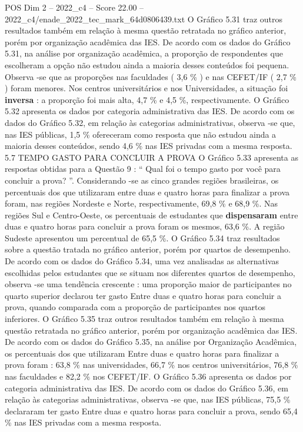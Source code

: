 \begin{textsample}{POS Dim 2 – 2022\_c4 – Score 22.00 – 2022\_c4/enade\_2022\_tec\_mark\_64d0806439.txt}
O Gráfico 5.31 traz outros resultados também em relação à mesma questão retratada no gráfico anterior, porém por organização acadêmica das IES.
De acordo com os dados do Gráfico 5.31, na análise por organização acadêmica, a proporção de respondentes que escolheram a opção não estudou ainda a maioria desses conteúdos foi pequena.
Observa -se que as proporções nas faculdades ( 3,6 \% ) e nas CEFET/IF ( 2,7 \% ) foram menores.
Nos centros universitários e nos Universidades, a situação foi \textbf{inversa} : a proporção foi mais alta, 4,7 \% e 4,5 \%, respectivamente.
O Gráfico 5.32 apresenta os dados por categoria administrativa das IES.
De acordo com os dados do Gráfico 5.32, em relação às categorias administrativas, observa -se que, nas IES públicas, 1,5 \% ofereceram como resposta que não estudou ainda a maioria desses conteúdos, sendo 4,6 \% nas IES privadas com a mesma resposta. 5.7 TEMPO GASTO PARA CONCLUIR A PROVA O Gráfico 5.33 apresenta as respostas obtidas para a Questão 9 : “ Qual foi o tempo gasto por você para concluir a prova? ”.
Considerando -se as cinco grandes regiões brasileiras, os percentuais dos que utilizaram entre duas e quatro horas para finalizar a prova foram, nas regiões Nordeste e Norte, respectivamente, 69,8 \% e 68,9 \%.
Nas regiões Sul e Centro-Oeste, os percentuais de estudantes que \textbf{dispensaram} entre duas e quatro horas para concluir a prova foram os mesmos, 63,6 \%.
A região Sudeste apresentou um percentual de 65,5 \%.
O Gráfico 5.34 traz resultados sobre a questão tratada no gráfico anterior, porém por quartos de desempenho.
De acordo com os dados do Gráfico 5.34, uma vez analisadas as alternativas escolhidas pelos estudantes que se situam nos diferentes quartos de desempenho, observa -se uma tendência crescente : uma proporção maior de participantes no quarto superior declarou ter gasto Entre duas e quatro horas para concluir a prova, quando comparada com a proporção de participantes nos quartos inferiores.
O Gráfico 5.35 traz outros resultados também em relação à mesma questão retratada no gráfico anterior, porém por organização acadêmica das IES.
De acordo com os dados do Gráfico 5.35, na análise por Organização Acadêmica, os percentuais dos que utilizaram Entre duas e quatro horas para finalizar a prova foram : 63,8 \% nas universidades, 66,7 \% nos centros universitários, 76,8 \% nas faculdades e 82,2 \% nos CEFET/IF.
O Gráfico 5.36 apresenta os dados por categoria administrativa das IES.
De acordo com os dados do Gráfico 5.36, em relação às categorias administrativas, observa -se que, nas IES públicas, 75,5 \% declararam ter gasto Entre duas e quatro horas para concluir a prova, sendo 65,4 \% nas IES privadas com a mesma resposta.

\end{textsample}
